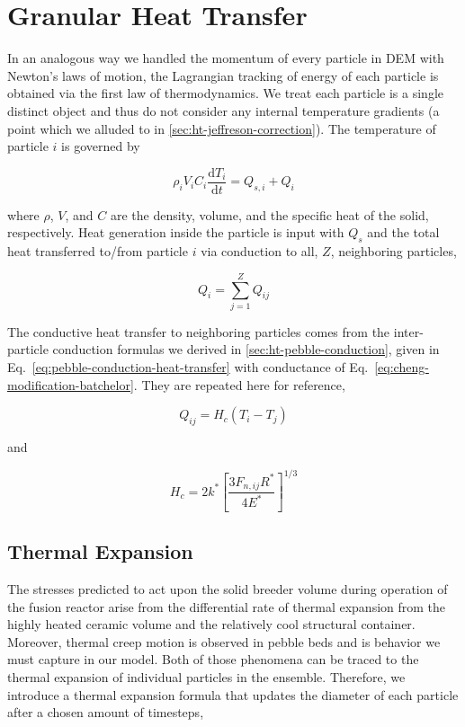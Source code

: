 \section{Granular Heat Transfer}\label{sec:dem-heat-transfer}

In an analogous way we handled the momentum of every particle in DEM with Newton's laws of motion, the Lagrangian tracking of energy of each particle is obtained via the first law of thermodynamics. We treat each particle is a single distinct object and thus do not consider any internal temperature gradients (a point which we alluded to in \cref{sec:ht-jeffreson-correction}). The temperature of particle $i$ is governed by

\begin{equation}\label{eq:thermoFirstLaw}
	\rho_iV_iC_i\frac{\mathrm{d}T_i}{\mathrm{d}t} = Q_{s,i} + Q_{i}
\end{equation}

where $\rho$, $V$, and $C$ are the density, volume, and the specific heat of the solid, respectively. Heat generation inside the particle is input with $Q_{s}$ and the total heat transferred to/from particle $i$ via conduction to all, $Z$, neighboring particles,

\begin{equation}
	Q_i = \sum_{j=1}^Z Q_{ij}
\end{equation}

The conductive heat transfer to neighboring particles comes from the inter-particle conduction formulas we derived in \cref{sec:ht-pebble-conduction}, given in Eq.~\ref{eq:pebble-conduction-heat-transfer} with conductance of Eq.~\ref{eq:cheng-modification-batchelor}. They are repeated here for reference,

\begin{equation*}
	Q_{ij} = H_c(T_i - T_j)
\end{equation*} 

and

\begin{equation}\label{eq:dem-conductance}
	H_c= 2k^*\left[\frac{3F_{n,ij}R^*}{4E^*}\right]^{1/3}
\end{equation}

\subsection{Thermal Expansion}
The stresses predicted to act upon the solid breeder volume during operation of the fusion reactor arise from the differential rate of thermal expansion from the highly heated ceramic volume and the relatively cool structural container. Moreover, thermal creep motion is observed in pebble beds\cite{Tanigawa:2010cr, Vargas2007, Chen2009, Divoux2008} and is behavior we must capture in our model. Both of those phenomena can be traced to the thermal expansion of individual particles in the ensemble. Therefore, we introduce a thermal expansion formula that updates the diameter of each particle after a chosen amount of timesteps,

